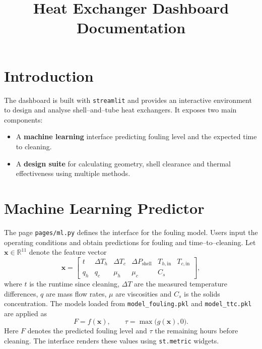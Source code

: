 \documentclass{article}
\title{Heat Exchanger Dashboard Documentation}
\author{}
\date{}
\begin{document}
\maketitle
\tableofcontents
\section{Introduction}
The dashboard is built with \texttt{streamlit} and provides an interactive environment to design and analyse shell--and--tube heat exchangers. It exposes two main components:
\begin{itemize}
  \item A \textbf{machine learning} interface predicting fouling level and the expected time to cleaning.
  \item A \textbf{design suite} for calculating geometry, shell clearance and thermal effectiveness using multiple methods.
\end{itemize}
\section{Machine Learning Predictor}
The page \texttt{pages/ml.py} defines the interface for the fouling model. Users input the operating conditions and obtain predictions for fouling and time--to--cleaning. Let $\mathbf{x} \in \mathbb{R}^{11}$ denote the feature vector
\begin{equation}
\mathbf{x}=\begin{bmatrix}
  t & \Delta T_h & \Delta T_c & \Delta P_{\text{shell}} & T_{h,\text{in}} & T_{c,\text{in}} \\ q_h & q_c & \mu_h & \mu_c & C_{s}
\end{bmatrix},
\end{equation}
where $t$ is the runtime since cleaning, $\Delta T$ are the measured temperature differences, $q$ are mass flow rates, $\mu$ are viscosities and $C_s$ is the solids concentration. The models loaded from \texttt{model\_fouling.pkl} and \texttt{model\_ttc.pkl} are applied as
\begin{equation}
F = f(\mathbf{x}), \qquad \tau = \max\bigl( g(\mathbf{x}),0 \bigr).
\end{equation}
Here $F$ denotes the predicted fouling level and $\tau$ the remaining hours before cleaning. The interface renders these values using \texttt{st.metric} widgets.
\end{document}
